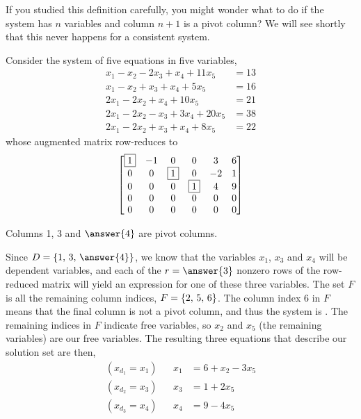 \documentclass{ximera}
\begin{document}
If you studied this definition carefully, you might wonder what to do if the system has $n$ variables and column $n+1$ is a pivot column?  We will see shortly that this never happens for a consistent system.

\begin{example}

Consider the system of five equations in five variables,
\begin{align*}
 x_1  - x_2  -2 x_3 +  x_4 + 11 x_5 &= 13 \\
x_1 - x_2 +  x_3+  x_4 + 5 x_5 &= 16 \\
 2 x_1  -2 x_2       +  x_4 + 10 x_5 &= 21 \\
 2 x_1  -2 x_2  - x_3 + 3 x_4 + 20 x_5 &= 38 \\
 2 x_1  -2 x_ 2 +  x_3 +  x_4 + 8 x_ 5&= 22
\end{align*}
whose augmented matrix row-reduces to
\[
\begin{bmatrix}
 \fbox{1} & -1 & 0 & 0 & 3 & 6 \\
 0 & 0 & \fbox{1} & 0 & -2 & 1 \\
 0 & 0 & 0 & \fbox{1} & 4 & 9 \\
 0 & 0 & 0 & 0 & 0 & 0 \\
 0 & 0 & 0 & 0 & 0 & 0
\end{bmatrix}
\]

Columns 1, 3 and $\answer{4}$ are pivot columns.

\begin{feedback}[correct]
  Since $D=\set{1,\,3,\,\answer{4}}$, we know that the variables
  $x_1$, $x_3$ and $x_4$ will be dependent variables, and each of the
  $r=\answer{3}$ nonzero rows of the row-reduced matrix will yield an
  expression for one of these three variables.  The set $F$ is all the
  remaining column indices, $F=\left\{2,\,5,\,6\right\}$.  The column index $6$
  in $F$ means that the final column is not a pivot column, and thus
  the system is
  .  The
  remaining indices in $F$ indicate free variables, so $x_2$ and $x_5$
  (the remaining variables) are our free variables.  The resulting
  three equations that describe our solution set are then,
  \begin{align*}
    (x_{d_1}=x_1)& & x_1&=6+x_2-3x_5\\
    (x_{d_2}=x_3)& & x_3&=1+2x_5\\
    (x_{d_3}=x_4)& & x_4&=9-4x_5
  \end{align*}
  

\end{feedback}
\end{example}
\end{document}
